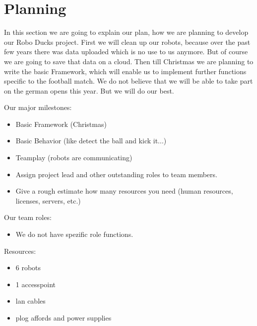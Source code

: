 \documentclass[12pt]{article}
\theoremstyle{definition}
\newenvironment{explanation}{%
   \setlength{\parindent}{0pt}
   \itshape
   \color{blue}
}{}
\begin{document}
\section{Planning}
\begin{explanation}
In this section we are going to explain our plan, how we are planning to develop our Robo Ducks project. First we will clean up our robots, because over the past few years there was data uploaded which is no use to us anymore. But of course we are going to save that data on a cloud. 
Then till Christmas we are planning to write the basic Framework, which will enable us to implement further functions specific to the football match. We do not believe that we will be able to take part on the german opens this year. But we will do our best. 

Our major milestones:
\begin{itemize}
\item Basic Framework (Christmas)
\item Basic Behavior (like detect the ball and kick it...)
\item Teamplay (robots are communicating)
\item Assign project lead and other outstanding roles to team members.
\item Give a rough estimate how many resources you need (human resources, licenses, servers, etc.)
\end{itemize}

Our team roles:
\begin{itemize}
\item We do not have spezific role functions. 
\end{itemize}

Resources:
\begin{itemize}
\item 6 robots
\item 1 accesspoint
\item lan cables
\item plog affords and power supplies
\end{itemize}



\end{explanation}
\end{document}
